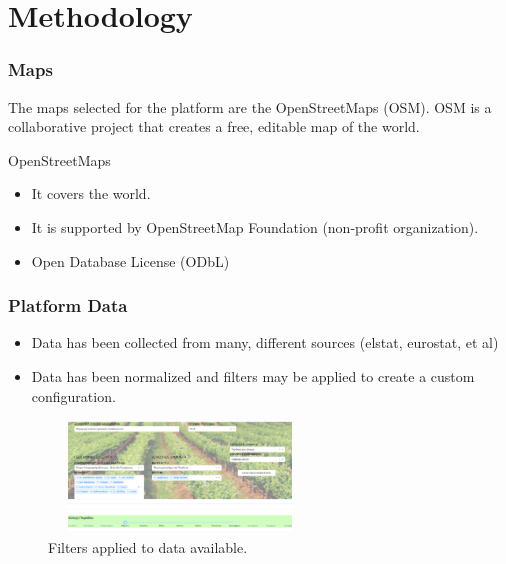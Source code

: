 \documentclass{beamer}
\begin{document}
   \section{Methodology}
    \begin{frame}
    \frametitle{Maps}
    The maps selected for the platform are the OpenStreetMaps (OSM).
    OSM is a collaborative project that creates a free, editable map of the world.
    
    \begin{block}{OpenStreetMaps}
		\begin{itemize}
        	\item It covers the world.
        	\item It is supported by OpenStreetMap Foundation (non-profit organization).
        	\item Open Database License (ODbL)
    	\end{itemize}
	\end{block}
    
    \end{frame}
    
    \begin{frame}
    \frametitle{Platform Data}
    
    \begin{itemize}
        \item Data has been collected from many, different sources (elstat, eurostat, et al)
        \item Data has been normalized and filters may be applied to create a custom configuration.
    \end{itemize}
    
    \begin{figure}[h]
    \centering
    \includegraphics[width=7cm, height=3cm]{1_platform_filters}
    \caption{Filters applied to data available.}
    \label{fig:filters1}
    \end{figure}
    
    \end{frame}
    
\end{document}
